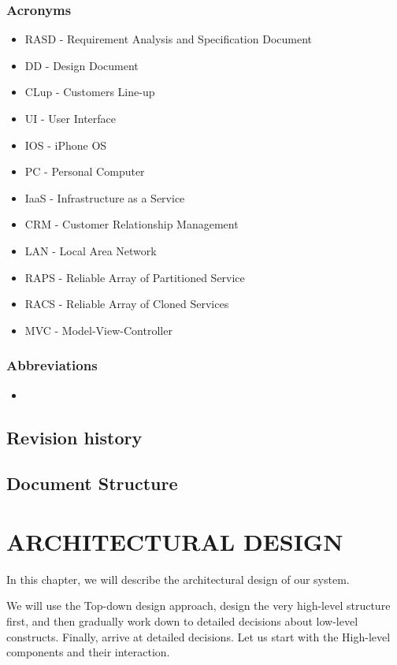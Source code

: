 \documentclass[a4paper,12pt]{report}
\begin{document}
\subsection{Acronyms}
\begin{itemize}
	\item RASD - Requirement Analysis and Specification Document
	\item DD - Design Document
	\item CLup - Customers Line-up
	\item UI - User Interface
	\item IOS - iPhone OS
	\item PC - Personal Computer
	\item IaaS - Infrastructure as a Service %
	\item CRM - Customer Relationship Management
	\item LAN - Local Area Network
	\item RAPS - Reliable Array of Partitioned Service
	\item RACS - Reliable Array of Cloned Services
	\item MVC - Model-View-Controller
\end{itemize}


\subsection{Abbreviations}
\begin{itemize}
	\item %
\end{itemize}


\section{Revision history}


\section{Document Structure}


\chapter{ARCHITECTURAL DESIGN}\label{ch:architectural-design}

In this chapter, we will describe the architectural design of our system.

We will use the Top-down design approach, design the very high-level structure first,
and then gradually work down to detailed decisions about low-level constructs.
Finally, arrive at detailed decisions.\cite{SlidesSE2}
Let us start with the High-level components and their interaction.
\end{document}
